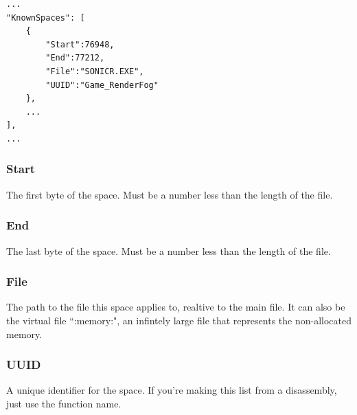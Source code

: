\documentclass[12pt,a4paper,notitlepage]{article}
\begin{document}
\begin{lstlisting}
...
"KnownSpaces": [
	{
		"Start":76948,
		"End":77212,
		"File":"SONICR.EXE",
		"UUID":"Game_RenderFog"
	},
	...
],
...
\end{lstlisting}

\subsubsection{Start}
The first byte of the space. Must be a number less than the length of the file.

\subsubsection{End}
The last byte of the space. Must be a number less than the length of the file.

\subsubsection{File}
The path to the file this space applies to, realtive to the main file. It can also be the virtual file ``:memory:", an infintely large file that represents the non-allocated memory.

\subsubsection{UUID}
A unique identifier for the space. If you're making this list from a disassembly, just use the function name.
\end{document}
